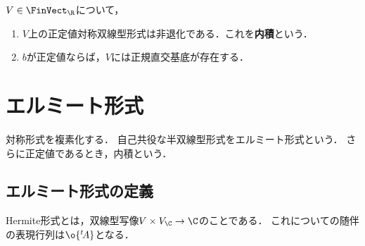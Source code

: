 \documentclass[uplatex, dvipdfmx]{jsreport}
\begin{document}
\begin{lemma}
    $V\in\FinVect_\R$について，
    \begin{enumerate}
        \item $V$上の正定値対称双線型形式は非退化である．これを\textbf{内積}という．
        \item $b$が正定値ならば，$V$には正規直交基底が存在する．
    \end{enumerate}
\end{lemma}

\section{エルミート形式}

\begin{tcolorbox}[colframe=ForestGreen, colback=ForestGreen!10!white, breakable]
    対称形式を複素化する．
    自己共役な半双線型形式をエルミート形式という．
    さらに正定値であるとき，内積という．
\end{tcolorbox}

\subsection{エルミート形式の定義}

\begin{tcolorbox}[colframe=ForestGreen, colback=ForestGreen!10!white, breakable]
    Hermite形式とは，双線型写像$V\times V_\C\to\C$のことである．
    これについての随伴の表現行列は$\o{{}^t\!A}$となる．
\end{tcolorbox}
\end{document}
